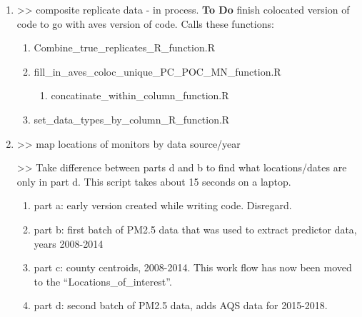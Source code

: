 \begin{enumerate}[nolistsep]
\item {} >> composite replicate data - in process. \textbf{To Do} finish colocated version of code to go with aves version of code. Calls these functions:
  \begin{enumerate}
  \item Combine\_true\_replicates\_R\_function.R
  \item fill\_in\_aves\_coloc\_unique\_PC\_POC\_MN\_function.R
    \begin{enumerate}
    \item concatinate\_within\_column\_function.R
    \end{enumerate}
  \item set\_data\_types\_by\_column\_R\_function.R
  \end{enumerate}
\item {} >> map locations of monitors by data source/year

 >> Take difference between parts d and b to find what locations/dates are only in part d. This script takes about 15 seconds on a laptop. %
\begin{enumerate}
\item part a: early version created while writing code. Disregard.
\item part b: first batch of PM2.5 data that was used to extract predictor data, years 2008-2014
\item part c: county centroids, 2008-2014. This work flow has now been moved to the ``Locations\_of\_interest''.
\item part d: second batch of PM2.5 data, adds AQS data for 2015-2018.

\end{enumerate}



\end{enumerate}

